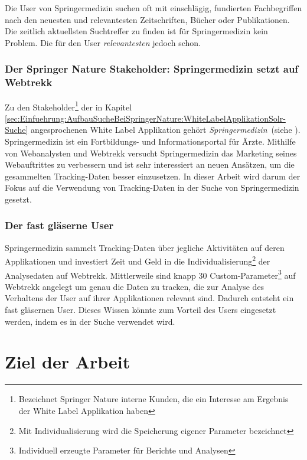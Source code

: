 Die User von Springermedizin suchen oft mit einschlägig, fundierten Fachbegriffen nach den neuesten und relevantesten Zeitschriften, Bücher oder Publikationen. Die zeitlich aktuellsten Suchtreffer zu finden ist für Springermedizin kein Problem. Die für den User \textit{relevantesten} jedoch schon.

\subsubsection{Der Springer Nature Stakeholder: Springermedizin setzt auf Webtrekk}
\label{sec:Einfuehrung:Problemstellung:Springermedizin}

Zu den Stakeholder\footnote{Bezeichnet Springer Nature interne Kunden, die ein Interesse am Ergebnis der White Label Applikation haben} der in Kapitel \ref{sec:Einfuehrung:AufbauSucheBeiSpringerNature:WhiteLabelApplikationSolr-Suche} angesprochenen White Label Applikation gehört \textit{Springermedizin}~(siehe \cite{SMED}). Springermedizin ist ein Fortbildungs- und Informationsportal für Ärzte. Mithilfe von Webanalysten und Webtrekk versucht Springermedizin das Marketing seines Webauftrittes zu verbessern und ist sehr interessiert an neuen Ansätzen, um die gesammelten Tracking-Daten besser einzusetzen. In dieser Arbeit wird darum der Fokus auf die Verwendung von Tracking-Daten in der Suche von Springermedizin gesetzt. 
 

\subsubsection{Der fast gläserne User}
\label{sec:Einfuehrung:Problemstellung:Glaeserne-User}

Springermedizin sammelt Tracking-Daten über jegliche Aktivitäten auf deren Applikationen und investiert Zeit und Geld in die Individualisierung\footnote{Mit Individualisierung wird die Speicherung eigener Parameter bezeichnet} der Analysedaten auf Webtrekk. Mittlerweile sind knapp 30 Custom-Parameter\footnote{Individuell erzeugte Parameter für Berichte und Analysen} auf Webtrekk angelegt um genau die Daten zu tracken, die zur Analyse des Verhaltens der User auf ihrer Applikationen relevant sind. Dadurch entsteht ein fast \glqq gläsernen User\grqq{}. Dieses Wissen könnte zum Vorteil des Users eingesetzt werden, indem es in der Suche verwendet wird.

\section{Ziel der Arbeit}
\label{sec:Einfuehrung:ZielArbeit}

